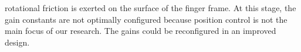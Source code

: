 \documentclass{llncs}
\begin{document}
rotational friction
is exerted on the surface of the finger frame.
At this stage, the gain constants are not optimally configured because position control is not the main focus of our research.
The gains could be reconfigured in an improved design.
% 

		


\end{document}
